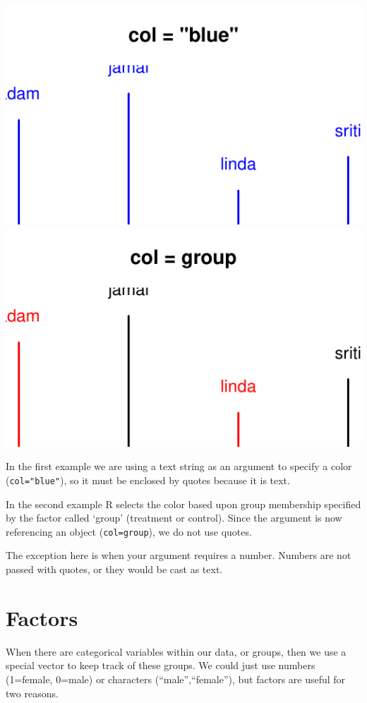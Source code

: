 \documentclass[]{book}
\theoremstyle{definition}
\theoremstyle{definition}
\theoremstyle{definition}
\theoremstyle{remark}
\begin{document}
\begin{center}\includegraphics[width=0.7\linewidth]{DS4PS-I_files/figure-latex/unnamed-chunk-63-1} \includegraphics[width=0.7\linewidth]{DS4PS-I_files/figure-latex/unnamed-chunk-63-2} \end{center}

In the first example we are using a text string as an argument to
specify a color (\texttt{col="blue"}), so it must be enclosed by quotes
because it is text.

In the second example R selects the color based upon group membership
specified by the factor called `group' (treatment or control). Since the
argument is now referencing an object (\texttt{col=group}), we do not
use quotes.

The exception here is when your argument requires a number. Numbers are
not passed with quotes, or they would be cast as text.

\hypertarget{factors}{%
\section{Factors}\label{factors}}

When there are categorical variables within our data, or groups, then we
use a special vector to keep track of these groups. We could just use
numbers (1=female, 0=male) or characters (``male'',``female''), but
factors are useful for two reasons.
\end{document}
